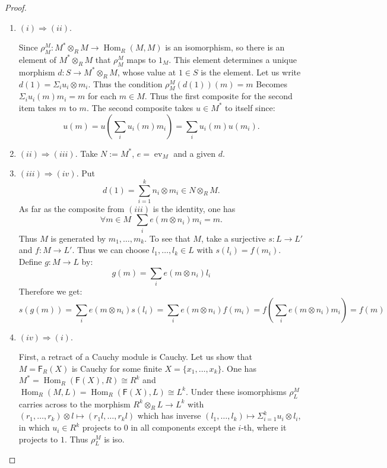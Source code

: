 \documentclass[8pt]{article}
\theoremstyle{definition}
\theoremstyle{definition}
\theoremstyle{definition}
\theoremstyle{definition}
\theoremstyle{definition}
\theoremstyle{definition}
\theoremstyle{definition}
\theoremstyle{definition}
\theoremstyle{definition}
\theoremstyle{definition}
\theoremstyle{definition}
\theoremstyle{definition}
\theoremstyle{definition}
\theoremstyle{definition}
\theoremstyle{question}
\begin{document}
\begin{proof}
  $ $

  \begin{enumerate}
    \item $(i) \Rightarrow (ii)$. 
    
    Since $\rho^M_M : M^* \otimes_R M \to \operatorname{Hom}_R(M, M)$ is an isomorphism, 
    so there is an element of $M^* \otimes_R M$ that $\rho^M_M$ maps to $1_M$. This element determines
    a unique morphism $d : S \to M^* \otimes_R M$, whose value at $1 \in S$ is the element.
    Let us write $d(1) = \Sigma_i u_i \otimes m_i$. Thus the condition $\rho^M_M(d(1))(m) = m$
    Becomes $\Sigma_i u_i (m) m_i = m$ for each $m \in M$.
    Thus the first composite for the second item takes $m$ to $m$.
    The second composite takes $u \in M^*$ to itself since:
    \[
    u(m) = u(\sum \limits_i u_i (m) m_i) = \sum \limits_i u_i (m) u(m_i).
    \]
    \item $(ii) \Rightarrow (iii)$. Take $N := M^*$, $e = \operatorname{ev}_M$ and a given $d$.
    \item $(iii) \Rightarrow (iv)$. Put
    \[
    d(1) = \sum \limits^k_{i = 1} n_i \otimes m_i \in N \otimes_R M.
    \]
    As far as the composite from $(iii)$ is the identity, one has
    \[
    \forall m \in M \:\: \sum \limits_i e(m \otimes n_i) m_i = m.
    \]
    Thus $M$ is generated by $m_1, \ldots, m_k$. To see that $M$,
    take a surjective $s : L \to L'$ and $f : M \to L'$.
    Thus we can choose $l_1, \ldots, l_k \in L$ with $s(l_i) = f(m_i)$.
    Define $g : M \to L$ by:
    \[
    g(m) = \sum \limits_i e(m \otimes n_i)l_i
    \]
    Therefore we get:
    \[
    s(g(m)) = \sum \limits_i e (m \otimes n_i) s(l_i) = \sum \limits_i e(m \otimes n_i) f(m_i) = f(\sum \limits_i e (m \otimes n_i) m_i) = f(m)
    \]
    \item $(iv) \Rightarrow (i)$.

    First, a retract of a Cauchy module is Cauchy. Let us show that $M = \mathsf{F}_R(X)$
    is Cauchy for some finite $X = \{ x_1, \ldots, x_k \}$.
    One has $M^* = \operatorname{Hom}_R(\mathsf{F}(X), R) \cong R^k$
    and $\operatorname{Hom}_R(M, L) = \operatorname{Hom}_R(\mathsf{F}(X), L) \cong L^k$.
    Under these isomorphisms $\rho^M_L$ carries across to the morphism
    $R^k \otimes_R L \to L^k$
    with $(r_1, \ldots, r_k) \otimes l \mapsto (r_1 l, \ldots, r_k l)$
    which has inverse $(l_1, \ldots, l_k) \mapsto \Sigma^k_{i = 1} u_i \otimes l_i$,
    in which $u_i \in R^k$ projects to $0$ in all components except the $i$-th,
    where it projects to $1$. Thus $\rho^M_L$ is iso.
  \end{enumerate}
\end{proof}
\end{document}
